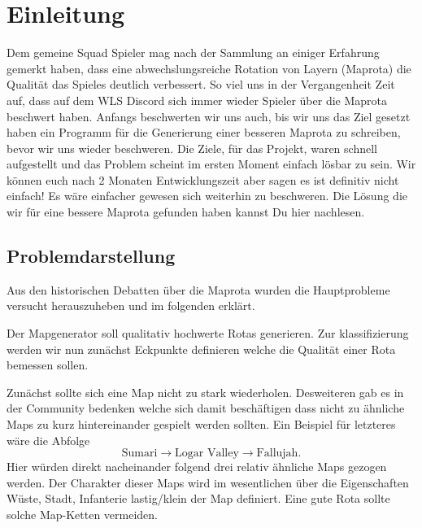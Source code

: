 \section{Einleitung}
        
        Dem gemeine Squad Spieler mag nach der Sammlung an einiger Erfahrung gemerkt haben, dass eine abwechslungsreiche Rotation von Layern (Maprota)
        die Qualität das Spieles deutlich verbessert. So viel uns in der Vergangenheit Zeit auf, dass auf dem WLS Discord sich immer wieder 
        Spieler über die Maprota beschwert haben. Anfangs beschwerten wir uns auch, bis wir uns das Ziel gesetzt haben ein Programm 
        für die Generierung einer besseren Maprota zu schreiben, bevor wir uns wieder beschweren. 
        Die Ziele, für das Projekt, waren schnell aufgestellt und das Problem scheint im ersten Moment einfach lösbar zu sein.
        Wir können euch nach 2 Monaten Entwicklungszeit aber sagen es ist definitiv nicht einfach! Es wäre einfacher gewesen sich weiterhin zu beschweren.
        Die Lösung die wir für eine bessere Maprota gefunden haben kannst Du hier nachlesen.  

        \subsection{Problemdarstellung}
            Aus den historischen Debatten über die Maprota wurden die Hauptprobleme versucht herauszuheben und im folgenden erklärt.

            Der Mapgenerator soll qualitativ hochwerte Rotas generieren.
            Zur klassifizierung werden wir nun zunächst Eckpunkte definieren welche die Qualität einer Rota bemessen sollen.

            Zunächst sollte sich eine Map nicht zu stark wiederholen.
            Desweiteren gab es in der Community bedenken welche sich damit beschäftigen dass nicht zu ähnliche Maps zu kurz hintereinander gespielt werden sollten. 
            Ein Beispiel für letzteres wäre die Abfolge 
            \begin{equation*}
                \text{Sumari} \rightarrow \text{Logar Valley} \rightarrow \text{Fallujah}.
            \end{equation*}
            Hier würden direkt nacheinander folgend drei relativ ähnliche Maps gezogen werden. 
            Der Charakter dieser Maps wird im wesentlichen über die Eigenschaften \glqq{}Wüste\grqq{}, \glqq{}Stadt\grqq{}, \glqq{}Infanterie lastig/klein\grqq{} der Map definiert.
            Eine gute Rota sollte solche Map-Ketten vermeiden.

